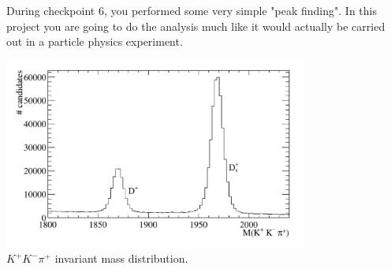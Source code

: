During checkpoint 6, you performed some very simple "peak finding". In this project you are going to do the analysis much like it would actually be carried out in a particle physics experiment.

%
\begin{center}
\includegraphics[width=0.75\textwidth]{figs/KKpi.pdf}\\
{\small $K^{+}K^{-}\pi^{+}$ invariant mass distribution.}
\end{center}
%


